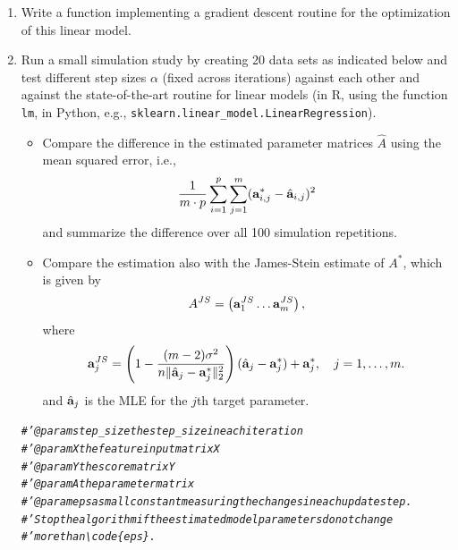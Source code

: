 \documentclass[a4paper]{article}
\makeatletter
\newcommand{\hlcom}[1]{\textcolor[rgb]{0.678,0.584,0.686}{\textit{#1}}}%
\newenvironment{kframe}{%
 \def\at@end@of@kframe{}%
 \ifinner\ifhmode%
  \def\at@end@of@kframe{\end{minipage}}%
  \begin{minipage}{\columnwidth}%
 \fi\fi%
 \def\FrameCommand##1{\hskip\@totalleftmargin \hskip-\fboxsep
 \colorbox{shadecolor}{##1}\hskip-\fboxsep
     \hskip-\linewidth \hskip-\@totalleftmargin \hskip\columnwidth}%
 \MakeFramed {\advance\hsize-\width
   \@totalleftmargin\z@ \linewidth\hsize
   \@setminipage}}%
 {\par\unskip\endMakeFramed%
 \at@end@of@kframe}
\newenvironment{knitrout}{}{} %
\makeatother
\begin{document}
{\begin{enumerate}
\begin{align*}
%		
		&\frac{\partial \bm{z}^\top \bm{B} \tilde{\bm{z}} }{\partial  \bm{B} } = \bm{z} \tilde{\bm{z}}^\top, \qquad \forall \bm{z}\in\R^n,\tilde{\bm{z}}\in \R^{m}, \bm{B}\in\R^{n \times m}, \\
%		
		&\frac{\partial \bm{z}^\top \bm{B} \bm{C} \bm{B}^\top \tilde{\bm{z}} }{\partial  \bm{B} } 
%		
		= 2 \bm{z} \tilde{\bm{z}}^\top \bm{B} \bm{C}^\top  , \qquad \forall \bm{z}\in\R^n,\tilde{\bm{z}}\in \R^{m}, \bm{B}\in\R^{n \times m}, \bm{C} \in \R^{n \times n}.
%		
	\end{align*}
%
	Moreover, any matrix product $\Xmat^\top Y$ can be written as the sum of outer products of the column and row vectors: $ \sum_{i=1}^n    \xi \yv^{(i)}.$
	
%
	Thus, the MLE coincides with the OLS in (a).		
	\item Write a function implementing a gradient descent routine for the optimization of this linear model.
	 \item Run a small simulation study by creating 20 data sets as indicated below and test different step sizes $\alpha$ (fixed across iterations) against each other and against the state-of-the-art routine for linear models (in R, using the function \texttt{lm}, in Python, e.g., \texttt{sklearn.linear\_model.LinearRegression}).
  \begin{itemize}
%  	
    \item Compare the difference in the estimated parameter matrices $\hat A$ using the mean squared error, i.e., 
    $$ \frac{1}{m\cdot p} \sum_{i=1}^p \sum_{j=1}^m (\mathbf{a}^{*}_{i,j}-\hat{\mathbf{a}}_{i,j})^2$$ 
    and summarize the difference over all 100 simulation repetitions.
%    
    \item Compare the estimation also with the James-Stein estimate of $A^*$, which is given by 
%    
	$$  A^{JS} = \left(  \mathbf{a}_1^{JS} \ldots \mathbf{a}_m^{JS}  \right),$$
%	
	where $$  \mathbf{a}_j^{JS} = \left (1 - \frac{(m-2)\sigma^2}{n\|\hat{\mathbf{a}}_j - \mathbf{a}_j^* \|^2_2} \right )  (\hat{\mathbf{a}}_j - \mathbf{a}_j^*) + \mathbf{a}_j^*, \quad j=1,\ldots,m.$$
%	
	and $\hat{\mathbf{a}}_j$ is the MLE for the $j$th target parameter.
%    
    \end{itemize}
%	
\begin{knitrout}
\color{fgcolor}\begin{kframe}
\begin{alltt}
\hlcom{#' @param step_size the step_size in each iteration}
\hlcom{#' @param X the feature input matrix X}
\hlcom{#' @param Y the score matrix Y}
\hlcom{#' @param A the parameter matrix}
\hlcom{#' @param eps a small constant measuring the changes in each update step. }
\hlcom{#' Stop the algorithm if the estimated model parameters do not change}
\hlcom{#' more than \textbackslash{}code\{eps\}.}


\end{alltt}
\end{kframe}
\end{knitrout}
\end{enumerate}}
\end{document}
